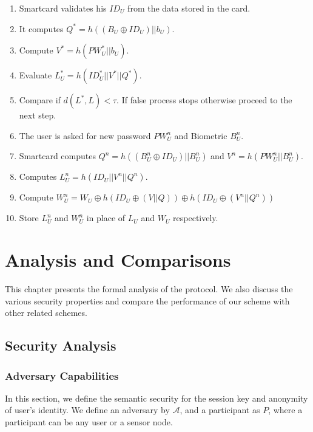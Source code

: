 \documentclass[a4paper,12pt]{report}
\begin{document}
\begin{enumerate}
\item Smartcard validates his $ID_U$ from the data stored in the card.
\item It computes $Q^{*} = h((B_{U} \oplus ID_{U})||b_U)$.
\item Compute $V^{*} = h(PW_{U}^{*} || b_{U})$.
\item Evaluate $L_U^{*} = h(ID_U^{*} || V^* || Q^* )$.
\item Compare if $d(L^{*}, L) < \tau$. If false process stops otherwise proceed to the next step.
\item The user is asked for new password $PW_{U}^{n}$ and Biometric $B_{U}^{n}$.
\item Smartcard computes $Q^{n} =  h((B_{U}^{n} \oplus ID_{U})|| B_{U}^{n})$  and $V^{n} = h(PW_{U}^{n} ||B_{U}^{n})$.
\item Computes $L_{U}^{n} = h(ID_{U}||V^{n}||Q^{n})$.
\item Compute $W_{U}^{n}= W_{U} \oplus  h(ID_{U} \oplus (V || Q)) \oplus h(ID_{U} \oplus (V^{n} || Q^{n}))$
\item Store $L_{U}^{n}$ and $W_{U}^{n}$ in place of $L_U$ and $W_U$ respectively.
\end{enumerate}


\afterpage{\null\newpage}
\chapter{Analysis and Comparisons}
\label{Ch5} This chapter presents the formal analysis of the
protocol. We also discuss the various security properties and
compare the performance of our scheme with other related schemes.
\medskip


\section{Security Analysis}
\subsection{Adversary Capabilities}
In this section, we define the semantic security for the session key
and anonymity of user's identity. We define an adversary by
$\mathcal{A}$, and a participant as $P$, where a participant can be
any user or a sensor node.
\end{document}
